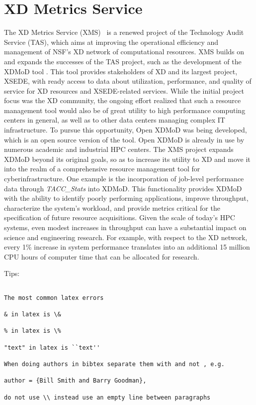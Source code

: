\section{XD Metrics Service}

The XD Metrics Service (XMS)~\cite{hid-sample-vonLaszewski15tas} is a
renewed project of the Technology Audit Service (TAS), which aims at
improving the operational efficiency and management of NSF's XD
network of computational resources. XMS builds on and expands the
successes of the TAS project, such as the development of the XDMoD
tool . This tool provides stakeholders of XD and its
largest project, XSEDE, with ready access to data about utilization,
performance, and quality of service for XD resources and XSEDE-related
services. While the initial project focus was the XD community, the
ongoing effort realized that such a resource management tool would
also be of great utility to high performance computing centers in
general, as well as to other data centers managing complex IT
infrastructure. To pursue this opportunity, Open XDMoD was being
developed, which is an open source version of the tool. Open XDMoD is
already in use by numerous academic and industrial HPC centers. The
XMS project expands XDMoD beyond its original goals, so as to increase
its utility to XD and move it into the realm of a comprehensive
resource management tool for cyberinfrastructure. One example is the
incorporation of job-level performance data through
\textit{TACC\_Stats} into XDMoD. This functionality
provides XDMoD with the ability to identify poorly performing
applications, improve throughput, characterize the system's workload,
and provide metrics critical for the specification of future resource
acquisitions. Given the scale of today's HPC systems, even modest
increases in throughput can have a substantial impact on science and
engineering research. For example, with respect to the XD network,
every 1\% increase in system performance translates into an additional
15 million CPU hours of computer time that can be allocated for
research.

Tips:

\begin{verbatim}

The most common latex errors 

& in latex is \&

% in latex is \%

"text" in latex is ``text''

When doing authors in bibtex separate them with and not , e.g. 

author = {Bill Smith and Barry Goodman},

do not use \\ instead use an empty line between paragraphs


\end{verbatim}

